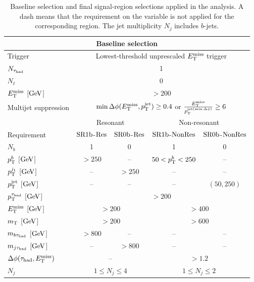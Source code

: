 \begin{table}[htbp]
    \centering
    \small
    \caption[Baseline selection and SR selections]{Baseline selection and final signal-region selections applied in the analysis. A dash means that the requirement on the variable is not applied for the corresponding region. The jet multiplicity $N_j$ includes $b$-jets.}
    \label{tab:ch7_signal_regions}
    \begin{tabular}{lcccc}
        \toprule
        \multicolumn{5}{c}{Baseline selection} \\
        \midrule
        Trigger & \multicolumn{4}{c}{Lowest-threshold unprescaled $E_{\mathrm{T}}^{\mathrm{miss}}$ trigger} \\
        $N_{\tau_{\mathrm{had}}}$ & \multicolumn{4}{c}{1} \\
        $N_\ell$ & \multicolumn{4}{c}{0} \\
        $E_{\mathrm{T}}^{\mathrm{miss}}$ [$\mathrm{GeV}$] & \multicolumn{4}{c}{$>200$} \\
        Multijet suppression & \multicolumn{4}{c}{$\min\Delta\phi(E_{\mathrm{T}}^{\mathrm{miss}},p_{\mathrm{T}}^{\mathrm{jet}})\geq0.4$ or $\frac{E_{\mathrm{T}}^{\mathrm{miss}}}{p_{\mathrm{T}}^{\mathrm{jet}(\min{\Delta\phi)}}}\geq6$} \\
        \midrule
        & \multicolumn{2}{c}{Resonant} & \multicolumn{2}{c}{Non-resonant} \\
        Requirement & $\mathrm{SR1b}$-$\mathrm{Res}$ & $\mathrm{SR0b}$-$\mathrm{Res}$ & $\mathrm{SR1b}$-$\mathrm{NonRes}$ & $\mathrm{SR0b}$-$\mathrm{NonRes}$ \\
        \midrule
        $N_b$ & 1 & 0 & 1 & 0 \\
        $p_{\mathrm{T}}^b$ [$\mathrm{GeV}$] & $>250$ & -- & $50<p_{\mathrm{T}}^b<250$ & -- \\
        $p_{\mathrm{T}}^{j_1}$ [$\mathrm{GeV}$] & -- & $>250$ & -- & -- \\
        $p_{\mathrm{T}}^{\mathrm{jet}}$ [$\mathrm{GeV}$] & -- & -- & -- & $(50,250)$ \\
        $p_{\mathrm{T}}^{\tau_{\mathrm{had}}}$ [$\mathrm{GeV}$] & \multicolumn{4}{c}{$>200$} \\
        $E_{\mathrm{T}}^{\mathrm{miss}}$ [$\mathrm{GeV}$] & \multicolumn{2}{c}{$>200$} & \multicolumn{2}{c}{$>400$} \\
        $m_{\mathrm{T}}$ [$\mathrm{GeV}$] & \multicolumn{2}{c}{$>200$} & \multicolumn{2}{c}{$>600$} \\
        $m_{b\tau_{\mathrm{had}}}$ [$\mathrm{GeV}$] & $>800$ & -- & -- & -- \\
        $m_{j\tau_{\mathrm{had}}}$ [$\mathrm{GeV}$] & -- & $>800$ & -- & -- \\
        $\Delta\phi(\tau_{\mathrm{had}}, E_{\mathrm{T}}^{\mathrm{miss}})$ & \multicolumn{2}{c}{--} & \multicolumn{2}{c}{$>1.2$} \\
        $N_j$ & \multicolumn{2}{c}{$1\leq N_j\leq4$} & \multicolumn{2}{c}{$1\leq N_j\leq2$} \\
        \bottomrule
    \end{tabular}
\end{table}

